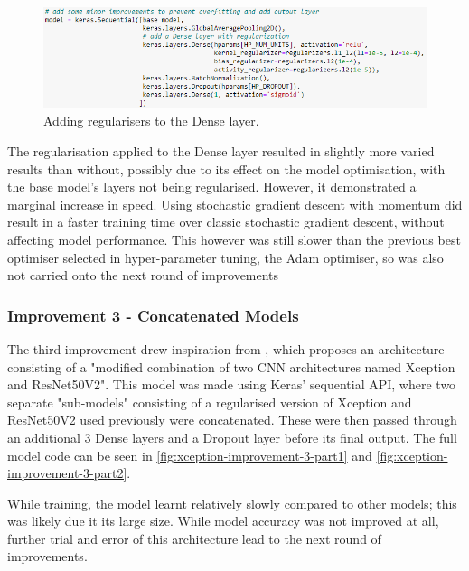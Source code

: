 \begin{figure}[H]
    \centering
    \includegraphics[width=\textwidth]{figures/xception-regular.png}
    \caption{Adding regularisers to the Dense layer.}
    \label{fig:xception-regular}
\end{figure}

The regularisation applied to the Dense layer resulted in slightly more varied results than without, possibly due to its effect on the model optimisation, with the base model's layers not being regularised. However, it demonstrated a marginal increase in speed. Using stochastic gradient descent with momentum did result in a faster training time over classic stochastic gradient descent, without affecting model performance. This however was still slower than the previous best optimiser selected in hyper-parameter tuning, the Adam optimiser, so was also not carried onto the next round of improvements

\subsubsection{Improvement 3 - Concatenated Models}
The third improvement drew inspiration from \cite[p. 343]{fitriasari2021improvement}, which proposes an architecture consisting of a "modified combination of two CNN architectures named Xception and ResNet50V2". This model was made using Keras' sequential API, where two separate "sub-models" consisting of a regularised version of Xception and ResNet50V2 used previously were concatenated. These were then passed through an additional 3 Dense layers and a Dropout layer before its final output. The full model code can be seen in \autoref{fig:xception-improvement-3-part1} and \autoref{fig:xception-improvement-3-part2}.

While training, the model learnt relatively slowly compared to other models; this was likely due it its large size. While model accuracy was not improved at all, further trial and error of this architecture lead to the next round of improvements.

